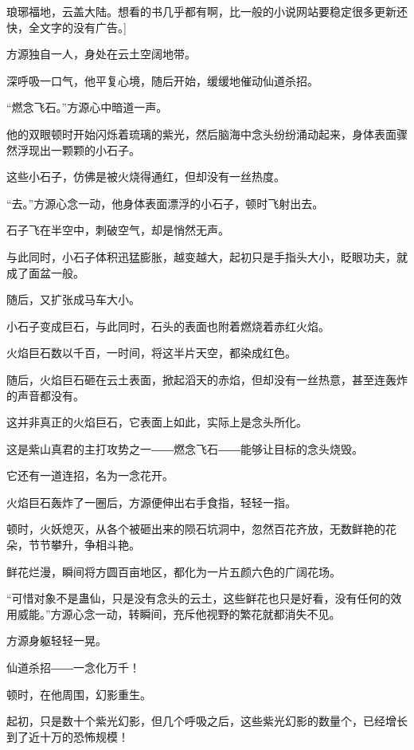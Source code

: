 
\begin{this_body}

琅琊福地，云盖大陆。想看的书几乎都有啊，比一般的小说网站要稳定很多更新还快，全文字的没有广告。]

方源独自一人，身处在云土空阔地带。

深呼吸一口气，他平复心境，随后开始，缓缓地催动仙道杀招。

“燃念飞石。”方源心中暗道一声。

他的双眼顿时开始闪烁着琉璃的紫光，然后脑海中念头纷纷涌动起来，身体表面骤然浮现出一颗颗的小石子。

这些小石子，仿佛是被火烧得通红，但却没有一丝热度。

“去。”方源心念一动，他身体表面漂浮的小石子，顿时飞射出去。

石子飞在半空中，刺破空气，却是悄然无声。

与此同时，小石子体积迅猛膨胀，越变越大，起初只是手指头大小，眨眼功夫，就成了面盆一般。

随后，又扩张成马车大小。

小石子变成巨石，与此同时，石头的表面也附着燃烧着赤红火焰。

火焰巨石数以千百，一时间，将这半片天空，都染成红色。

随后，火焰巨石砸在云土表面，掀起滔天的赤焰，但却没有一丝热意，甚至连轰炸的声音都没有。

这并非真正的火焰巨石，它表面上如此，实际上是念头所化。

这是紫山真君的主打攻势之一――燃念飞石――能够让目标的念头烧毁。

它还有一道连招，名为一念花开。

火焰巨石轰炸了一圈后，方源便伸出右手食指，轻轻一指。

顿时，火妖熄灭，从各个被砸出来的陨石坑洞中，忽然百花齐放，无数鲜艳的花朵，节节攀升，争相斗艳。

鲜花烂漫，瞬间将方圆百亩地区，都化为一片五颜六色的广阔花场。

“可惜对象不是蛊仙，只是没有念头的云土，这些鲜花也只是好看，没有任何的效用威能。”方源心念一动，转瞬间，充斥他视野的繁花就都消失不见。

方源身躯轻轻一晃。

仙道杀招――一念化万千！

顿时，在他周围，幻影重生。

起初，只是数十个紫光幻影，但几个呼吸之后，这些紫光幻影的数量个，已经增长到了近十万的恐怖规模！


\end{this_body}
